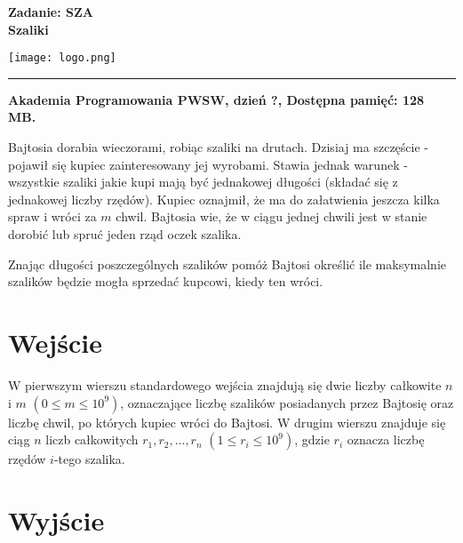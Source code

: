 \documentclass[10pt]{article}
\begin{document}
    

    \noindent
    \begin{minipage}{0.5\textwidth}
        \LARGE{\textsf{\textbf{Zadanie: SZA\\Szaliki}}}
    \end{minipage}
    \begin{minipage}{0.5\textwidth}
        \begin{flushright}
            \texttt{[image: logo.png]}
        \end{flushright}
    \end{minipage}
    
    \noindent\rule{\textwidth}{0.4pt}
    
    \noindent\textbf{Akademia Programowania PWSW, dzień ?, Dostępna pamięć: 128 MB.}
    \vspace{1em}
    
    
    \noindent
    Bajtosia dorabia wieczorami, robiąc szaliki na drutach. Dzisiaj ma szczęście - pojawił się kupiec zainteresowany jej wyrobami. Stawia jednak warunek - wszystkie szaliki jakie kupi mają być jednakowej długości (składać się z jednakowej liczby rzędów). Kupiec oznajmił, że ma do załatwienia jeszcza kilka spraw i wróci za $m$ chwil. Bajtosia wie, że w ciągu jednej chwili jest w stanie dorobić lub spruć jeden rząd oczek szalika.
    
    Znając długości poszczególnych szalików pomóż Bajtosi określić ile maksymalnie szalików będzie mogła sprzedać kupcowi, kiedy ten wróci.


    \section*{Wejście}
    
    W pierwszym wierszu standardowego wejścia znajdują się dwie liczby całkowite $n$ i $m$ $(0\leq m\leq 10^{9})$, oznaczające liczbę szalików posiadanych przez Bajtosię oraz liczbę chwil, po których kupiec wróci do Bajtosi. W drugim wierszu znajduje się ciąg $n$ liczb całkowitych $r_{1}, r_{2}, \ldots, r_{n}$ $(1 \leq r_{i} \leq 10^{9})$, gdzie $r_{i}$ oznacza liczbę rzędów $i$-tego szalika.


    \section*{Wyjście}
    
\end{document}
